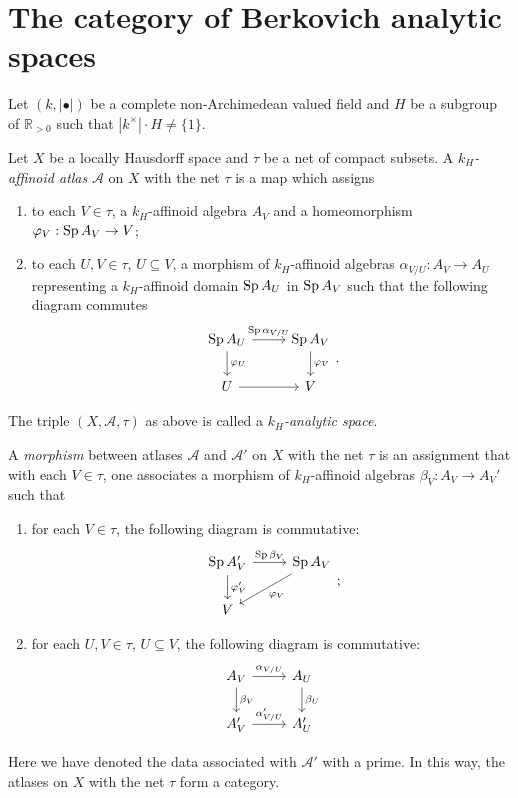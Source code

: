 \section{The category of Berkovich analytic spaces}
Let $(k,|\bullet|)$ be a complete non-Archimedean valued field and $H$ be a subgroup of $\mathbb{R}_{>0}$ such that $|k^{\times}|\cdot H\neq \{1\}$.
 
\begin{definition}
    Let $X$ be a locally Hausdorff space and $\tau$ be a net of compact subsets. A \emph{$k_H$-affinoid atlas} $\mathcal{A}$ on $X$ with the net $\tau$ is a map which assigns 
    \begin{enumerate}
        \item to each $V\in \tau$, a $k_H$-affinoid algebra $A_V$ and a homeomorphism $\varphi_V:\operatorname{Sp} A_V\rightarrow V$;
        \item to each $U,V\in \tau$, $U\subseteq V$, a morphism of $k_H$-affinoid algebras $\alpha_{V/U}:A_V\rightarrow A_U$ representing a $k_H$-affinoid domain $\operatorname{Sp} A_U$ in $\operatorname{Sp} A_V$ such that the following diagram commutes
        \[
            \begin{tikzcd}
                \Sp A_U \arrow[d, "\varphi_U"] \arrow[r, "\Sp \alpha_{V/U}"] & \Sp A_V \arrow[d, "\varphi_V"] \\
                U \arrow[r]                                                  & V                             
            \end{tikzcd}.  
        \]
    \end{enumerate}
    The triple $(X,\mathcal{A},\tau)$ as above is called a \emph{$k_H$-analytic space}.

    A \emph{morphism} between atlases $\mathcal{A}$ and $\mathcal{A}'$ on $X$ with the net $\tau$ is an assignment that with each $V\in \tau$, one associates a morphism of $k_H$-affinoid algebras $\beta_V:A_V\rightarrow A_V'$ such that
    \begin{enumerate}
        \item for each $V\in \tau$, the following diagram is commutative:
        \[
            \begin{tikzcd}
                \Sp A_V' \arrow[d, "\varphi_V'"] \arrow[r, "\Sp \beta_V"] & \Sp A_V \arrow[ld, "\varphi_V"] \\
                V                                                         &                                
                \end{tikzcd};
        \]
        \item for each $U,V\in \tau$, $U\subseteq V$, the following diagram is commutative:
        \[
            \begin{tikzcd}
                A_V \arrow[r, "\alpha_{V/U}"] \arrow[d, "\beta_V"] & A_U \arrow[d, "\beta_U"] \\
                A_V' \arrow[r, "\alpha'_{V/U}"]                    & A_U'                    
            \end{tikzcd}
        \]
    \end{enumerate}
    Here we have denoted the data associated with $\mathcal{A}'$ with a prime. In this way, the atlases on $X$ with the net $\tau$ form a category.
\end{definition}
